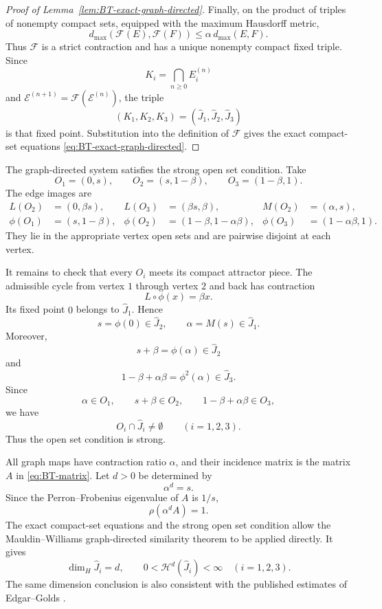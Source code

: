 \documentclass[11pt]{amsart}
\theoremstyle{plain}
\theoremstyle{definition}
\theoremstyle{remark}
\begin{document}
\begin{proof}[Proof of Lemma~\ref{lem:BT-exact-graph-directed}]
Finally, on the product of triples of nonempty compact sets, equipped with
the maximum Hausdorff metric,
\[
        d_{\max}(\mathcal F(E),\mathcal F(F))
        \leq
        \alpha\,d_{\max}(E,F).
\]
Thus \(\mathcal F\) is a strict contraction and has a unique nonempty
compact fixed triple. Since
\[
        K_i=\bigcap_{n\geq0}E_i^{(n)}
\]
and \(\mathcal E^{(n+1)}=\mathcal F(\mathcal E^{(n)})\), the triple
\[
        (K_1,K_2,K_3)
        =
        (\widehat J_1,\widehat J_2,\widehat J_3)
\]
is that fixed point. Substitution into the definition of \(\mathcal F\)
gives the exact compact-set equations
\eqref{eq:BT-exact-graph-directed}.
\end{proof}


The graph-directed system satisfies the strong open set condition. Take
\[
        O_1=(0,s),\qquad
        O_2=(s,1-\beta),\qquad
        O_3=(1-\beta,1).
\]
The edge images are
\[
\begin{aligned}
L(O_2)&=(0,\beta s),&
L(O_3)&=(\beta s,\beta),&
M(O_2)&=(\alpha,s),\\
\phi(O_1)&=(s,1-\beta),&
\phi(O_2)&=(1-\beta,1-\alpha\beta),&
\phi(O_3)&=(1-\alpha\beta,1).
\end{aligned}
\]
They lie in the appropriate vertex open sets and are pairwise disjoint at each vertex.

It remains to check that every \(O_i\) meets its compact attractor piece. The admissible
cycle from vertex \(1\) through vertex \(2\) and back has contraction
\[
        L\circ\phi(x)=\beta x.
\]
Its fixed point \(0\) belongs to \(\widehat J_1\). Hence
\[
        s=\phi(0)\in\widehat J_2,
        \qquad
        \alpha=M(s)\in\widehat J_1.
\]
Moreover,
\[
        s+\beta=\phi(\alpha)\in\widehat J_2
\]
and
\[
        1-\beta+\alpha\beta=\phi^2(\alpha)\in\widehat J_3.
\]
Since
\[
        \alpha\in O_1,\qquad
        s+\beta\in O_2,\qquad
        1-\beta+\alpha\beta\in O_3,
\]
we have
\[
        O_i\cap\widehat J_i\neq\emptyset
        \qquad(i=1,2,3).
\]
Thus the open set condition is strong.

All graph maps have contraction ratio \(\alpha\), and their incidence matrix is the matrix
\(A\) in \eqref{eq:BT-matrix}. Let \(d>0\) be determined by
\[
        \alpha^d=s.
\]
Since the Perron--Frobenius eigenvalue of \(A\) is \(1/s\),
\[
        \rho(\alpha^dA)=1.
\]
The exact compact-set equations and the strong open set condition allow the
Mauldin--Williams graph-directed similarity theorem
\cite{MauldinWilliams1988} to be applied directly. It gives
\[
        \dim_H\widehat J_i=d,
        \qquad
        0<\mathcal H^d(\widehat J_i)<\infty
        \quad(i=1,2,3).
\]
The same dimension conclusion is also consistent with the published estimates of
Edgar--Golds \cite[Theorems~3.5 and~3.14]{EdgarGolds1999}.
\end{document}
